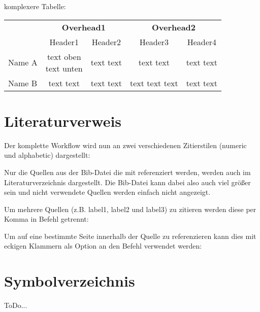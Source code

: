komplexere Tabelle:

\begin{table}[!hbtp]
\begin{tabular}{@{} lcccc @{}}
 \toprule
 \hfil\multirow{2}{*}{\textbf{Name}}    & \multicolumn{2}{c}{\textbf{Overhead1}}  & \multicolumn{2}{c}{\textbf{Overhead2}}  \\
                             & Header1  & Header2  & Header3  & Header4  \\
 \midrule
 Name A & \makecell[c]{text oben \\ text unten} & text text & text text & text text \\
 Name B & text text & text text & text text text & text text \\
 \bottomrule
 \end{tabular}
\end{table}

\section{Literaturverweis}

Der komplette Workflow wird nun an zwei verschiedenen Zitierstilen (numeric und alphabetic) dargestellt:

Nur die Quellen aus der Bib-Datei die mit \cite{dirac} referenziert werden, werden auch im Literaturverzeichnis dargestellt. Die Bib-Datei kann dabei also auch viel größer sein und nicht verwendete Quellen werden einfach nicht angezeigt.

Um mehrere Quellen (z.B. label1, label2 und label3) zu zitieren werden diese per Komma in \cite{dirac,einstein,knuth-fa} Befehl getrennt:

Um auf eine bestimmte Seite innerhalb der Quelle zu referenzieren kann dies mit eckigen Klammern als Option an den \cite[S. 8]{einstein} Befehl verwendet werden:

\section{Symbolverzeichnis}

ToDo...

